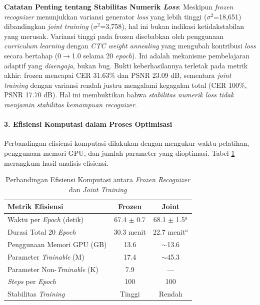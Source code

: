 \documentclass[12pt,a4paper]{article}
\begin{document}
\vspace{0.5em}

\textbf{Catatan Penting tentang Stabilitas Numerik \textit{Loss}}:
Meskipun \textit{frozen recognizer} menunjukkan variansi generator \textit{loss} yang lebih tinggi ($\sigma^2$=18,651) dibandingkan \textit{joint training} ($\sigma^2$=3,758), hal ini bukan indikasi ketidakstabilan yang merusak. Variansi tinggi pada frozen disebabkan oleh penggunaan \textit{curriculum learning} dengan \textit{CTC weight annealing} yang mengubah kontribusi \textit{loss} secara bertahap (0$\rightarrow$1.0 selama 20 \textit{epoch}). Ini adalah mekanisme pembelajaran adaptif yang \textit{disengaja}, bukan bug. Bukti keberhasilannya terletak pada metrik akhir: frozen mencapai CER 31.63\% dan PSNR 23.09 dB, sementara \textit{joint training} dengan variansi rendah justru mengalami kegagalan total (CER 100\%, PSNR 17.70 dB). Hal ini membuktikan bahwa \textit{stabilitas numerik \textit{loss} tidak menjamin stabilitas kemampuan \textit{recognizer}}.

\vspace{0.5em}

\paragraph{3. Efisiensi Komputasi dalam Proses Optimisasi}

Perbandingan efisiensi komputasi dilakukan dengan mengukur waktu pelatihan, penggunaan memori GPU, dan jumlah parameter yang dioptimasi. Tabel \ref{tab:frozen-vs-joint-efficiency} merangkum hasil analisis efisiensi.

\begin{table}[H]
\centering
\caption{Perbandingan Efisiensi Komputasi antara \textit{Frozen Recognizer} dan \textit{Joint Training}}
\label{tab:frozen-vs-joint-efficiency}
\begin{tabular}{lcc}
\toprule
\textbf{Metrik Efisiensi} & \textbf{Frozen} & \textbf{Joint} \\
\midrule
Waktu per \textit{Epoch} (detik) & 67.4 $\pm$ 0.7 & 68.1 $\pm$ 1.5$^{a}$ \\
Durasi Total 20 \textit{Epoch} & 30.3 menit & 22.7 menit$^{a}$ \\
Penggunaan Memori GPU (GB) & 13.6 & $\sim$13.6 \\
Parameter \textit{Trainable} (M) & 17.4 & $\sim$45.3 \\
Parameter Non-\textit{Trainable} (K) & 7.9 & --- \\
\textit{Steps} per \textit{Epoch} & 100 & 100 \\
Stabilitas \textit{Training} & Tinggi & Rendah \\
\bottomrule
\end{tabular}
\end{table}
\end{document}
